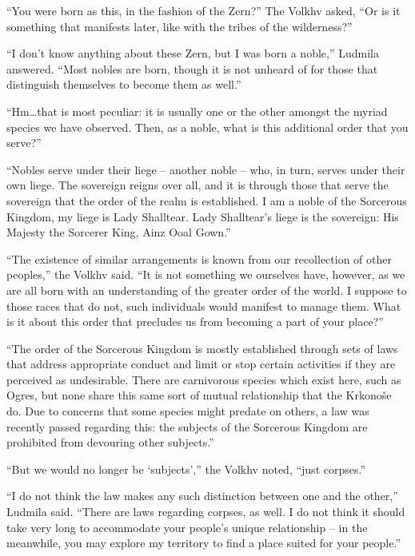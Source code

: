 “You were born as this, in the fashion of the Zern?” The Volkhv asked, “Or is it something that manifests later, like with the tribes of the wilderness?”

 

“I don’t know anything about these Zern, but I was born a noble,” Ludmila answered. “Most nobles are born, though it is not unheard of for those that distinguish themselves to become them as well.”

 

“Hm…that is most peculiar: it is usually one or the other amongst the myriad species we have observed. Then, as a noble, what is this additional order that you serve?”

 

“Nobles serve under their liege – another noble – who, in turn, serves under their own liege. The sovereign reigns over all, and it is through those that serve the sovereign that the order of the realm is established. I am a noble of the Sorcerous Kingdom, my liege is Lady Shalltear. Lady Shalltear’s liege is the sovereign: His Majesty the Sorcerer King, Ainz Ooal Gown.”

 

“The existence of similar arrangements is known from our recollection of other peoples,” the Volkhv said. “It is not something we ourselves have, however, as we are all born with an understanding of the greater order of the world. I suppose to those races that do not, such individuals would manifest to manage them. What is it about this order that precludes us from becoming a part of your place?”

 

“The order of the Sorcerous Kingdom is mostly established through sets of laws that address appropriate conduct and limit or stop certain activities if they are perceived as undesirable. There are carnivorous species which exist here, such as Ogres, but none share this same sort of mutual relationship that the Krkonoše do. Due to concerns that some species might predate on others, a law was recently passed regarding this: the subjects of the Sorcerous Kingdom are prohibited from devouring other subjects.”

 

“But we would no longer be ‘subjects’,” the Volkhv noted, “just corpses.”

 

“I do not think the law makes any such distinction between one and the other,” Ludmila said. “There are laws regarding corpses, as well. I do not think it should take very long to accommodate your people’s unique relationship – in the meanwhile, you may explore my territory to find a place suited for your people.”

